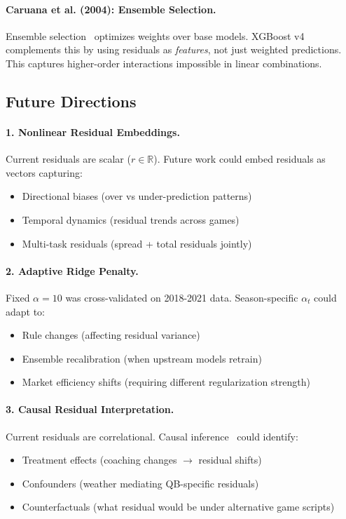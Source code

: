 \paragraph{Caruana et al. (2004): Ensemble Selection.}
Ensemble selection~\cite{caruana2004ensemble} optimizes weights over base models. XGBoost v4 complements this by using residuals as \textit{features}, not just weighted predictions. This captures higher-order interactions impossible in linear combinations.

\subsection{Future Directions}

\paragraph{1. Nonlinear Residual Embeddings.}
Current residuals are scalar ($r \in \mathbb{R}$). Future work could embed residuals as vectors capturing:
\begin{itemize}[itemsep=2pt,parsep=0pt]
    \item Directional biases (over vs under-prediction patterns)
    \item Temporal dynamics (residual trends across games)
    \item Multi-task residuals (spread + total residuals jointly)
\end{itemize}

\paragraph{2. Adaptive Ridge Penalty.}
Fixed $\alpha=10$ was cross-validated on 2018-2021 data. Season-specific $\alpha_t$ could adapt to:
\begin{itemize}[itemsep=2pt,parsep=0pt]
    \item Rule changes (affecting residual variance)
    \item Ensemble recalibration (when upstream models retrain)
    \item Market efficiency shifts (requiring different regularization strength)
\end{itemize}

\paragraph{3. Causal Residual Interpretation.}
Current residuals are correlational. Causal inference~\cite{pearl2009causality} could identify:
\begin{itemize}[itemsep=2pt,parsep=0pt]
    \item Treatment effects (coaching changes $\to$ residual shifts)
    \item Confounders (weather mediating QB-specific residuals)
    \item Counterfactuals (what residual would be under alternative game scripts)
\end{itemize}

